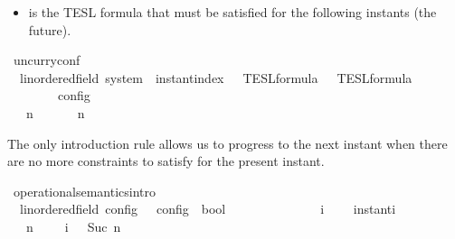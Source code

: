 \begin{isabellebody}
\begin{isamarkuptext}
\begin{itemize}
\item \isa{{\isasymPhi}} is the TESL formula that must be satisfied for the following instants (the future).%
\end{itemize}%
\end{isamarkuptext}\isamarkuptrue%
\isamarkupfalse%
\ uncurry{\isacharunderscore}conf\isanewline
\ \ {\isacharcolon}{\isacharcolon}{\isacartoucheopen}{\isacharparenleft}{\isacharprime}{\isasymtau}{\isacharcolon}{\isacharcolon}linordered{\isacharunderscore}field{\isacharparenright}\ system\ {\isasymRightarrow}\ instant{\isacharunderscore}index\ {\isasymRightarrow}\ {\isacharprime}{\isasymtau}\ TESL{\isacharunderscore}formula\ {\isasymRightarrow}\ {\isacharprime}{\isasymtau}\ TESL{\isacharunderscore}formula\isanewline
\ \ \ \ \ \ {\isasymRightarrow}\ {\isacharprime}{\isasymtau}\ config{\isacartoucheclose}\ \ \ \ \ \ \ \ \ \ \ \ \ \ \ \ \ \ \ \ \ \ \ \ \ \ \ \ \ \ \ \ \ \ \ \ \ \ \ \ \ \ \ \ \ \ \ \ \ \ {\isacharparenleft}{\isacartoucheopen}{\isacharunderscore}{\isacharcomma}\ {\isacharunderscore}\ {\isasymturnstile}\ {\isacharunderscore}\ {\isasymtriangleright}\ {\isacharunderscore}{\isacartoucheclose}\ {}{}{\isacharparenright}\isanewline
{}\isanewline
\ \ {\isacartoucheopen}{\isasymGamma}{\isacharcomma}\ n\ {\isasymturnstile}\ {\isasymPsi}\ {\isasymtriangleright}\ {\isasymPhi}\ {\isasymequiv}\ {\isacharparenleft}{\isasymGamma}{\isacharcomma}\ n{\isacharcomma}\ {\isasymPsi}{\isacharcomma}\ {\isasymPhi}{\isacharparenright}{\isacartoucheclose}%
\begin{isamarkuptext}%
The only introduction rule allows us to progress to the next instant 
  when there are no more constraints to satisfy for the present instant.%
\end{isamarkuptext}\isamarkuptrue%
\isamarkupfalse%
\ operational{\isacharunderscore}semantics{\isacharunderscore}intro\isanewline
\ \ {\isacharcolon}{\isacharcolon}{\isacartoucheopen}{\isacharparenleft}{\isacharprime}{\isasymtau}{\isacharcolon}{\isacharcolon}linordered{\isacharunderscore}field{\isacharparenright}\ config\ {\isasymRightarrow}\ {\isacharprime}{\isasymtau}\ config\ {\isasymRightarrow}\ bool{\isacartoucheclose}\ \ \ \ \ \ \ \ \ \ \ \ \ \ {\isacharparenleft}{\isacartoucheopen}{\isacharunderscore}\ {\isasymhookrightarrow}\isactrlsub i\ {\isacharunderscore}{\isacartoucheclose}\ {}{}{\isacharparenright}\isanewline
{}\isanewline
\ \ instant{\isacharunderscore}i{\isacharcolon}\isanewline
\ \ {\isacartoucheopen}{\isacharparenleft}{\isasymGamma}{\isacharcomma}\ n\ {\isasymturnstile}\ {\isacharbrackleft}{\isacharbrackright}\ {\isasymtriangleright}\ {\isasymPhi}{\isacharparenright}\ {\isasymhookrightarrow}\isactrlsub i\ \ {\isacharparenleft}{\isasymGamma}{\isacharcomma}\ Suc\ n\ {\isasymturnstile}\ {\isasymPhi}\ {\isasymtriangleright}\ {\isacharbrackleft}{\isacharbrackright}{\isacharparenright}{\isacartoucheclose}%

\end{isabellebody}
